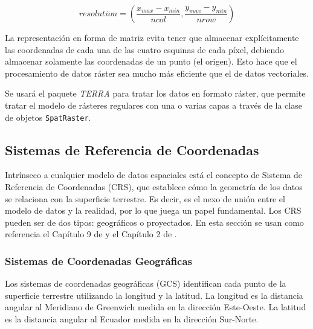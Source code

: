 \documentclass[12pt,a4paper,]{book}
\numberwithin{dummy}{section}
\theoremstyle{ocrenumbox}
\theoremstyle{blacknumex}
\theoremstyle{blacknumbox}
\theoremstyle{ocrenum}
\theoremstyle{ocrenum}
\begin{document}
\[ resolution = \left(\frac{x_{max}-x_{min}}{ncol},\frac{y_{max}-y_{min}}{nrow}\right) \]

La representación en forma de matriz evita tener que almacenar
explícitamente las coordenadas de cada una de las cuatro esquinas de
cada píxel, debiendo almacenar solamente las coordenadas de un punto (el
origen). Esto hace que el procesamiento de datos ráster sea mucho más
eficiente que el de datos vectoriales.

Se usará el paquete \emph{TERRA} para tratar los datos en formato
ráster, que permite tratar el modelo de rásteres regulares con una o
varias capas a través de la clase de objetos \texttt{SpatRaster}.

\hypertarget{sistemas-de-referencia-de-coordenadas}{%
\subsection{Sistemas de Referencia de
Coordenadas}\label{sistemas-de-referencia-de-coordenadas}}

Intrínseco a cualquier modelo de datos espaciales está el concepto de
Sistema de Referencia de Coordenadas (CRS), que establece cómo la
geometría de los datos se relaciona con la superficie terrestre. Es
decir, es el nexo de unión entre el modelo de datos y la realidad, por
lo que juega un papel fundamental. Los CRS pueden ser de dos tipos:
geográficos o proyectados. En esta sección se usan como referencia el
Capítulo 9 de \citet{introGISGimond} y el Capítulo 2 de
\citet{lovelace_geocomputation_2019}.

\hypertarget{sistemas-de-coordenadas-geogruxe1ficas}{%
\subsubsection*{Sistemas de Coordenadas
Geográficas}\label{sistemas-de-coordenadas-geogruxe1ficas}}

Los sistemas de coordenadas geográficas (GCS) identifican cada punto de
la superficie terrestre utilizando la longitud y la latitud. La longitud
es la distancia angular al Meridiano de Greenwich medida en la dirección
Este-Oeste. La latitud es la distancia angular al Ecuador medida en la
dirección Sur-Norte.
\end{document}
